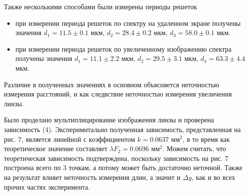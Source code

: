\documentclass[a4paper,12pt]{article}
\begin{document}
\noindent
Также несколькими способами были измерены периоды решеток
\begin{itemize}
    \item при измерении периода решеток по спектру на удаленном экране получены значения $d_1 = 11.5 \pm 0.1$ мкм, $d_2 = 28.4 \pm 0.2$ мкм, $d_3 = 58.0 \pm 0.1$ мкм.
    \item при измерении периода решеток по увеличенному изображению спектра получены значения $d_1 = 11.1 \pm 2.2$ мкм, $d_2 = 29.5 \pm 3.1$ мкм, $d_3 = 63.3 \pm 4.4$ мкм.
\end{itemize}
Различие в полученных значениях в основном объясняется неточностью измерения расстояний, и как следвствие неточностью измерения увеличения линзы.

\noindent
Было проделано мультиплицирование изображения линзы и проверена зависимость (4). Эксперимнтально полученная зависимость, представленная на рис. 7, является линейной с коэффициентом $k = 0.0637$ мм$^2$, в то время как теоретическое значение составляет $\lambda F_2 = 0.0696$ мм$^2$. Можем считать, что теоретическая зависимость подтверждена, поскольку зависимость на рис. 7 построена всего по 3 точкам, а потому может быть достаточно неточной. Также на результат влияет неточность измерения длин, а значит и $\Delta y$, как и во всех прочих частях эксперимента.
\end{document}
